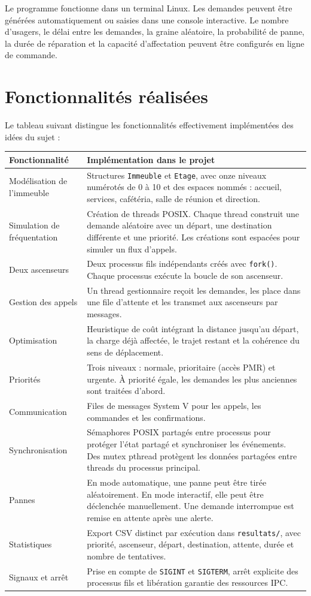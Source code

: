 \documentclass[11pt,a4paper]{article}
\begin{document}
Le programme fonctionne dans un terminal Linux. Les demandes peuvent être générées automatiquement ou saisies dans une console interactive. Le nombre d'usagers, le délai entre les demandes, la graine aléatoire, la probabilité de panne, la durée de réparation et la capacité d'affectation peuvent être configurés en ligne de commande.

\section{Fonctionnalités réalisées}

Le tableau suivant distingue les fonctionnalités effectivement implémentées des idées du sujet :

\begin{longtable}{p{3.6cm}p{10.8cm}}
\toprule
\textbf{Fonctionnalité} & \textbf{Implémentation dans le projet}\\
\midrule
\endhead
Modélisation de l'immeuble & Structures \texttt{Immeuble} et \texttt{Etage}, avec onze niveaux numérotés de 0 à 10 et des espaces nommés : accueil, services, cafétéria, salle de réunion et direction.\\
Simulation de fréquentation & Création de threads POSIX. Chaque thread construit une demande aléatoire avec un départ, une destination différente et une priorité. Les créations sont espacées pour simuler un flux d'appels.\\
Deux ascenseurs & Deux processus fils indépendants créés avec \texttt{fork()}. Chaque processus exécute la boucle de son ascenseur.\\
Gestion des appels & Un thread gestionnaire reçoit les demandes, les place dans une file d'attente et les transmet aux ascenseurs par messages.\\
Optimisation & Heuristique de coût intégrant la distance jusqu'au départ, la charge déjà affectée, le trajet restant et la cohérence du sens de déplacement.\\
Priorités & Trois niveaux : normale, prioritaire (accès PMR) et urgente. À priorité égale, les demandes les plus anciennes sont traitées d'abord.\\
Communication & Files de messages System V pour les appels, les commandes et les confirmations.\\
Synchronisation & Sémaphores POSIX partagés entre processus pour protéger l'état partagé et synchroniser les événements. Des mutex pthread protègent les données partagées entre threads du processus principal.\\
Pannes & En mode automatique, une panne peut être tirée aléatoirement. En mode interactif, elle peut être déclenchée manuellement. Une demande interrompue est remise en attente après une alerte.\\
Statistiques & Export CSV distinct par exécution dans \texttt{resultats/}, avec priorité, ascenseur, départ, destination, attente, durée et nombre de tentatives.\\
Signaux et arrêt & Prise en compte de \texttt{SIGINT} et \texttt{SIGTERM}, arrêt explicite des processus fils et libération garantie des ressources IPC.\\
\bottomrule
\end{longtable}
\end{document}
